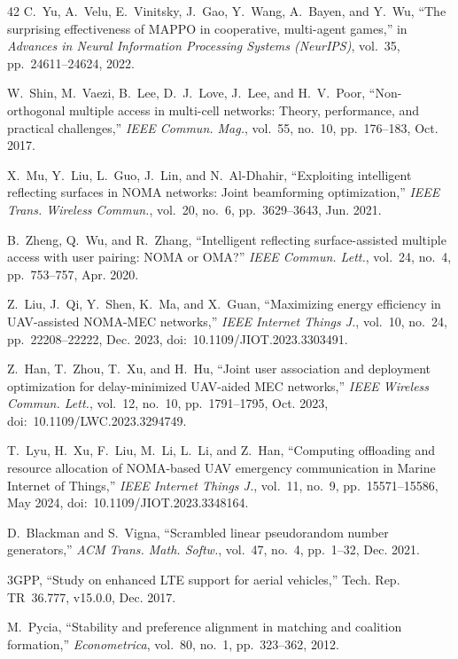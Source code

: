 \documentclass[journal]{IEEEtran}
\begin{document}
\begin{thebibliography}{42}
 C.~Yu, A.~Velu, E.~Vinitsky, J.~Gao, Y.~Wang, A.~Bayen, and Y.~Wu, ``The surprising effectiveness of MAPPO in cooperative, multi-agent games,'' in \emph{Advances in Neural Information Processing Systems (NeurIPS)}, vol.~35, pp.~24611--24624, 2022.

 W.~Shin, M.~Vaezi, B.~Lee, D.~J.~Love, J.~Lee, and H.~V.~Poor, ``Non-orthogonal multiple access in multi-cell networks: Theory, performance, and practical challenges,'' \emph{IEEE Commun. Mag.}, vol.~55, no.~10, pp.~176--183, Oct. 2017.

 X.~Mu, Y.~Liu, L.~Guo, J.~Lin, and N.~Al-Dhahir, ``Exploiting intelligent reflecting surfaces in NOMA networks: Joint beamforming optimization,'' \emph{IEEE Trans. Wireless Commun.}, vol.~20, no.~6, pp.~3629--3643, Jun. 2021.

 B.~Zheng, Q.~Wu, and R.~Zhang, ``Intelligent reflecting surface-assisted multiple access with user pairing: NOMA or OMA?'' \emph{IEEE Commun. Lett.}, vol.~24, no.~4, pp.~753--757, Apr. 2020.

 Z.~Liu, J.~Qi, Y.~Shen, K.~Ma, and X.~Guan, ``Maximizing energy efficiency in UAV-assisted NOMA-MEC networks,'' \emph{IEEE Internet Things J.}, vol.~10, no.~24, pp.~22208--22222, Dec. 2023, doi:~10.1109/JIOT.2023.3303491.

 Z.~Han, T.~Zhou, T.~Xu, and H.~Hu, ``Joint user association and deployment optimization for delay-minimized UAV-aided MEC networks,'' \emph{IEEE Wireless Commun. Lett.}, vol.~12, no.~10, pp.~1791--1795, Oct. 2023, doi:~10.1109/LWC.2023.3294749.

 T.~Lyu, H.~Xu, F.~Liu, M.~Li, L.~Li, and Z.~Han, ``Computing offloading and resource allocation of NOMA-based UAV emergency communication in Marine Internet of Things,'' \emph{IEEE Internet Things J.}, vol.~11, no.~9, pp.~15571--15586, May 2024, doi:~10.1109/JIOT.2023.3348164.

 D.~Blackman and S.~Vigna, ``Scrambled linear pseudorandom number generators,'' \emph{ACM Trans. Math. Softw.}, vol.~47, no.~4, pp.~1--32, Dec. 2021.

 3GPP, ``Study on enhanced LTE support for aerial vehicles,'' Tech. Rep. TR~36.777, v15.0.0, Dec. 2017.

 M.~Pycia, ``Stability and preference alignment in matching and coalition formation,'' \emph{Econometrica}, vol.~80, no.~1, pp.~323--362, 2012.


\end{thebibliography}
\end{document}
